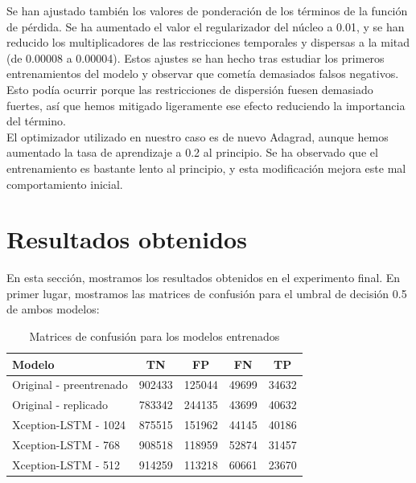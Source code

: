 \documentclass[../main.tex]{memoir}
\begin{document}
Se han ajustado también los valores de ponderación de los términos de
la función de pérdida. Se ha aumentado el valor el regularizador del
núcleo a 0.01, y se han reducido los multiplicadores de las
restricciones temporales y dispersas a la mitad (de 0.00008 a
0.00004). Estos ajustes se han hecho tras estudiar los primeros
entrenamientos del modelo y observar que cometía demasiados falsos
negativos. Esto podía ocurrir porque las restricciones de dispersión
fuesen demasiado fuertes, así que hemos mitigado ligeramente ese
efecto reduciendo la importancia del término.\\

El optimizador utilizado en nuestro caso es de nuevo Adagrad, aunque
hemos aumentado la tasa de aprendizaje a 0.2 al principio. Se ha
observado que el entrenamiento es bastante lento al principio, y esta
modificación mejora este mal comportamiento inicial.

\section{Resultados obtenidos}

En esta sección, mostramos los resultados obtenidos en el experimento
final. En primer lugar, mostramos las matrices de confusión para el
umbral de decisión 0.5 de ambos modelos:

\begin{table}[H]
  \centering
  \begin{tabular}{lcccc}
    \toprule
    Modelo & TN & FP & FN & TP \\
    \midrule
    Original - preentrenado & 902433 & 125044 & 49699 & 34632 \\
    Original - replicado & 783342 & 244135 & 43699 & 40632 \\
    Xception-LSTM - 1024 & 875515 & 151962 & 44145 & 40186 \\
    Xception-LSTM - 768 & 908518 & 118959 & 52874 & 31457 \\
    Xception-LSTM - 512 & 914259 & 113218 & 60661 & 23670 \\
    \bottomrule
  \end{tabular}
  \caption{Matrices de confusión para los modelos entrenados}
  \label{tab:confusion-matrices}
\end{table}
\end{document}
